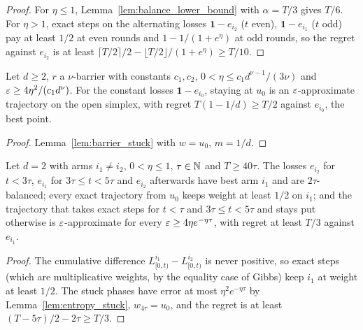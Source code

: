 \begin{proof}
  \leanok
  For $\eta \le 1$, Lemma~\ref{lem:balance_lower_bound} with $\alpha = T/3$ gives $T/6$. For
  $\eta > 1$, exact steps on the alternating losses $\mathbf 1 - e_{i_2}$ ($t$ even),
  $\mathbf 1 - e_{i_1}$ ($t$ odd) pay at least $1/2$ at even rounds and $1 - 1/(1 + e^\eta)$ at odd
  rounds, so the regret against $e_{i_2}$ is at least
  $\lceil T/2\rceil/2 - \lfloor T/2\rfloor/(1 + e^\eta) \ge T/10$.
\end{proof}

\begin{theorem}
  \label{thm:dimension_lower_bound}
  \leanok
  Let $d \ge 2$, $r$ a $\nu$-barrier with constants $c_1, c_2$, $0 < \eta \le c_1d^{\nu-1}/(3\nu)$ and
  $\varepsilon \ge 4\eta^2/(c_1d^\nu)$. For the constant losses $\mathbf 1 - e_{i_0}$, staying at $u_0$ is an
  $\varepsilon$-approximate trajectory on the open simplex, with regret $T(1 - 1/d) \ge T/2$ against
  $e_{i_0}$, the best point.
\end{theorem}

\begin{proof}
  \leanok
  Lemma~\ref{lem:barrier_stuck} with $w = u_0$, $m = 1/d$.
\end{proof}

\begin{theorem}
  \label{thm:three_phase_lower_bound}
  \leanok
  Let $d = 2$ with arms $i_1 \ne i_2$, $0 < \eta \le 1$, $\tau \in \mathbb{N}$ and $T \ge 40\tau$. The losses
  $e_{i_2}$ for $t < 3\tau$, $e_{i_1}$ for $3\tau \le t < 5\tau$ and $e_{i_2}$ afterwards have best
  arm $i_1$ and are $2\tau$-balanced; every exact trajectory from $u_0$ keeps weight at least $1/2$
  on $i_1$; and the trajectory that takes exact steps for $t < \tau$ and $3\tau \le t < 5\tau$ and
  stays put otherwise is $\varepsilon$-approximate for every $\varepsilon \ge 4\eta e^{-\eta\tau}$, with regret
  at least $T/3$ against $e_{i_1}$.
\end{theorem}

\begin{proof}
  \leanok
  The cumulative difference $L^{i_1}_{[0,t)} - L^{i_2}_{[0,t)}$ is never positive, so exact steps
  (which are multiplicative weights, by the equality case of Gibbs) keep $i_1$ at weight at least
  $1/2$. The stuck phases have error at most $\eta^2e^{-\eta\tau}$ by Lemma~\ref{lem:entropy_stuck},
  $w_{4\tau} = u_0$, and the regret is at least $(T - 5\tau)/2 - 2\tau \ge T/3$.
\end{proof}
